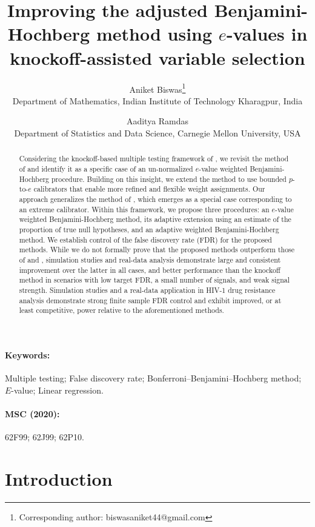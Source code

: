 \documentclass[11pt]{article}
\title{\Large\bfseries
Improving the adjusted Benjamini-Hochberg method using $e$-values in knockoff-assisted variable selection
}
\author{
Aniket Biswas\thanks{Corresponding author: biswasaniket44@gmail.com} \\
\small Department of Mathematics, Indian Institute of Technology Kharagpur, India
\and
Aaditya Ramdas \\
\small Department of Statistics and Data Science, Carnegie Mellon University, USA
}
\date{}
\numberwithin{equation}{section}
\theoremstyle{plain}
\theoremstyle{remark}
\begin{document}
\maketitle

\begin{abstract}
\noindent Considering the knockoff-based multiple testing framework of \citet{barber2015controlling}, we revisit the method of \citet{sarkar2022adjusting} and identify it as a specific case of an un-normalized $e$-value weighted Benjamini-Hochberg procedure. Building on this insight, we extend the method to use bounded $p$-to-$e$ calibrators that enable more refined and flexible weight assignments. Our approach generalizes the method of \citet{sarkar2022adjusting}, which emerges as a special case corresponding to an extreme calibrator. Within this framework, we propose three procedures: an $e$-value weighted Benjamini-Hochberg method, its adaptive extension using an estimate of the proportion of true null hypotheses, and an adaptive weighted Benjamini-Hochberg method. We establish control of the false discovery rate (FDR) for the proposed methods. While we do not formally prove that the proposed methods outperform those of \citet{barber2015controlling} and \citet{sarkar2022adjusting}, simulation studies and real-data analysis demonstrate large and consistent improvement over the latter in all cases, and better performance than the knockoff method in scenarios with low target FDR, a small number of signals, and weak signal strength. Simulation studies and a real-data application in HIV-1 drug resistance analysis demonstrate strong finite sample FDR control and exhibit improved, or at least competitive, power relative to the aforementioned methods.  
\end{abstract}

\paragraph{Keywords:}
Multiple testing; False discovery rate; Bonferroni--Benjamini--Hochberg method; $E$-value; Linear regression.

\paragraph{MSC (2020):}
62F99; 62J99; 62P10.

\section{Introduction}
\end{document}
